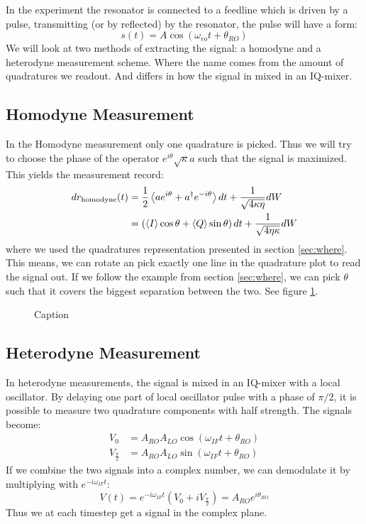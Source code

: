 In the experiment the resonator is connected to a feedline which is driven by a pulse, transmitting (or by reflected) by the resonator, the pulse will have a form:
\begin{equation}
    s(t) = A \cos(\omega_{ro}t + \theta_{RO}) 
\end{equation}
We will look at two methods of extracting the signal: a homodyne and a heterodyne measurement scheme.  Where the name comes from the amount of quadratures we readout. And differs in how the signal in mixed in an IQ-mixer.

\subsection{Homodyne Measurement}
In the Homodyne measurement only one quadrature is picked. Thus we will try to choose the phase of the operator $e^{i\theta}\sqrt{\kappa}a$ such that the signal is maximized. This yields the measurement record:
\begin{align}
    dr_{\text{homodyne}}(t) &= \frac12 \expval{ae^{i\theta} + a^\dagger e^{-i\theta}}dt + \frac{1}{\sqrt{4\kappa\eta}} dW \nonumber \\
    &= \left(\expval{I} \cos\theta+ \expval{Q}\sin{\theta}\right)dt  + \frac{1}{\sqrt{4\eta\kappa}}dW
\end{align}
where we used the quadratures representation presented in section \ref{sec:where}. This means, we can rotate an pick exactly one line in the quadrature plot to read the signal out. If we follow the example from section \ref{sec:where}, we can pick $\theta$ such that it covers the biggest separation between the two. See figure \ref{fig:homodyne_detection}.

\begin{figure}
    \centering
    \caption{Caption}
    \label{fig:homodyne_detection}
\end{figure}

\subsection{Heterodyne Measurement}
In heterodyne measurements, the signal is mixed in an IQ-mixer with a local oscillator. By delaying one part of local oscillator pulse with a phase of $\pi / 2$, it is possible to measure two quadrature components with half strength. The signals become:
\begin{align}
    V_0               &= A_{RO}A_{LO} \cos(\omega_{IF}t + \theta_{RO}) \\
    V_{\frac{\pi}{2}} &= A_{RO}A_{LO} \sin(\omega_{IF}t + \theta_{RO})
\end{align}
If we combine the two signals into a complex number, we can demodulate it by multiplying with $e^{-i\omega_{IF}t}$:
\begin{equation}
    V(t) = e^{-i\omega_{IF} t} (V_0 + i V_{\frac{\pi}{2}}) = A_{RO} e^{i\theta_{RO}}
\end{equation}
Thus we at each timestep get a signal in the complex plane. 

